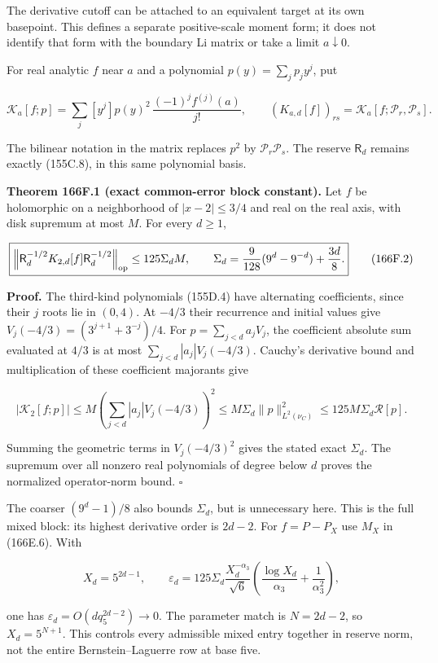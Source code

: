 \documentclass[
  11pt,
]{book}
\begin{document}
The derivative cutoff can be attached to an equivalent target at its own
basepoint. This defines a separate positive-scale moment form; it does
not identify that form with the boundary Li matrix or take a limit
\(a\downarrow0\).

For real analytic \(f\) near \(a\) and a polynomial
\(p(y)=\sum_jp_jy^j\), put

\[
\mathcal K_a[f;p]=\sum_j[y^j]p(y)^2\,
 \frac{(-1)^jf^{(j)}(a)}{j!},\qquad
(K_{a,d}[f])_{rs}=\mathcal K_a[f;\mathcal P_r,\mathcal P_s].
\tag{166F.1}
\]

The bilinear notation in the matrix replaces \(p^2\) by
\(\mathcal P_r\mathcal P_s\). The reserve \(\mathsf R_d\) remains
exactly (155C.8), in this same polynomial basis.

\textbf{Theorem 166F.1 (exact common-error block constant).} Let \(f\)
be holomorphic on a neighborhood of \(|x-2|\le3/4\) and real on the real
axis, with disk supremum at most \(M\). For every \(d\ge1\),

\[
\boxed{\left\|\mathsf R_d^{-1/2}K_{2,d}[f]\mathsf R_d^{-1/2}\right\|_{\rm op}
\le125\Sigma_d M,\qquad
\Sigma_d=\frac9{128}(9^d-9^{-d})+\frac{3d}{8}.}
\tag{166F.2}
\]

\textbf{Proof.} The third-kind polynomials (155D.4) have alternating
coefficients, since their \(j\) roots lie in \((0,4)\). At \(-4/3\)
their recurrence and initial values give
\(V_j(-4/3)=(3^{j+1}+3^{-j})/4\). For \(p=\sum_{j<d}a_jV_j\), the
coefficient absolute sum evaluated at \(4/3\) is at most
\(\sum_{j<d}|a_j|V_j(-4/3)\). Cauchy's derivative bound and
multiplication of these coefficient majorants give

\[
|\mathcal K_2[f;p]|
\le M\left(\sum_{j<d}|a_j|V_j(-4/3)\right)^2
\le M\Sigma_d\|p\|_{L^2(\nu_C)}^2
\le125M\Sigma_d\mathcal R[p].
\]

Summing the geometric terms in \(V_j(-4/3)^2\) gives the stated exact
\(\Sigma_d\). The supremum over all nonzero real polynomials of degree
below \(d\) proves the normalized operator-norm bound. \(\square\)

The coarser \((9^d-1)/8\) also bounds \(\Sigma_d\), but is unnecessary
here. This is the full mixed block: its highest derivative order is
\(2d-2\). For \(f=P-P_X\) use \(M_X\) in (166E.6). With

\[
X_d=5^{2d-1},\qquad
\varepsilon_d=125\Sigma_d
\frac{X_d^{-\alpha_3}}{\sqrt6}
 \left(\frac{\log X_d}{\alpha_3}+\frac1{\alpha_3^2}\right),
\tag{166F.3}
\]

one has \(\varepsilon_d=O(dq_5^{2d-2})\to0\). The parameter match is
\(N=2d-2\), so \(X_d=5^{N+1}\). This controls every admissible mixed
entry together in reserve norm, not the entire Bernstein--Laguerre row
at base five.
\end{document}
